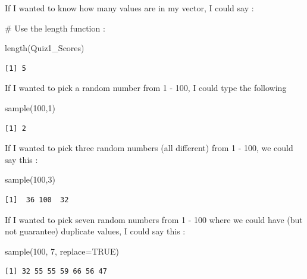 \documentclass[
  letterpaper,
  DIV=11,
  numbers=noendperiod]{scrreprt}
\newenvironment{Shaded}{\begin{snugshade}}{\end{snugshade}}
\newcommand{\AttributeTok}[1]{\textcolor[rgb]{0.40,0.45,0.13}{#1}}
\newcommand{\CommentTok}[1]{\textcolor[rgb]{0.37,0.37,0.37}{#1}}
\newcommand{\ConstantTok}[1]{\textcolor[rgb]{0.56,0.35,0.01}{#1}}
\newcommand{\DecValTok}[1]{\textcolor[rgb]{0.68,0.00,0.00}{#1}}
\newcommand{\FunctionTok}[1]{\textcolor[rgb]{0.28,0.35,0.67}{#1}}
\newcommand{\NormalTok}[1]{\textcolor[rgb]{0.00,0.23,0.31}{#1}}
\begin{document}
If I wanted to know how many values are in my vector, I could say :

\begin{Shaded}
\begin{Highlighting}[]
\CommentTok{\# Use the length function :}

\FunctionTok{length}\NormalTok{(Quiz1\_Scores)}
\end{Highlighting}
\end{Shaded}

\begin{verbatim}
[1] 5
\end{verbatim}

If I wanted to pick a random number from 1 - 100, I could type the
following

\begin{Shaded}
\begin{Highlighting}[]
\FunctionTok{sample}\NormalTok{(}\DecValTok{100}\NormalTok{,}\DecValTok{1}\NormalTok{)}
\end{Highlighting}
\end{Shaded}

\begin{verbatim}
[1] 2
\end{verbatim}

If I wanted to pick three random numbers (all different) from 1 - 100,
we could say this :

\begin{Shaded}
\begin{Highlighting}[]
\FunctionTok{sample}\NormalTok{(}\DecValTok{100}\NormalTok{,}\DecValTok{3}\NormalTok{)}
\end{Highlighting}
\end{Shaded}

\begin{verbatim}
[1]  36 100  32
\end{verbatim}

If I wanted to pick seven random numbers from 1 - 100 where we could
have (but not guarantee) duplicate values, I could say this :

\begin{Shaded}
\begin{Highlighting}[]
\FunctionTok{sample}\NormalTok{(}\DecValTok{100}\NormalTok{, }\DecValTok{7}\NormalTok{, }\AttributeTok{replace=}\ConstantTok{TRUE}\NormalTok{)}
\end{Highlighting}
\end{Shaded}

\begin{verbatim}
[1] 32 55 55 59 66 56 47
\end{verbatim}
\end{document}
